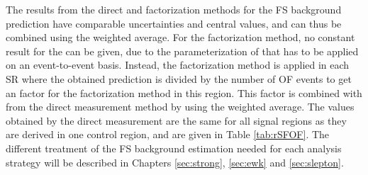 The results from the direct and factorization methods for the FS background prediction have comparable uncertainties and central values, and can thus be combined using the weighted average. 
For the factorization method, no constant result for the \Rsfof can be given, due to the parameterization of \rmue that has to be applied on an event-to-event basis.
Instead, the factorization method is applied in each SR where the obtained prediction is divided by the number of OF events to get an \Rsfof factor for the factorization method in this region. 
This factor is combined with \Rsfof from the direct measurement method by using the weighted average.
The \Rsfof values obtained by the direct measurement are the same for all signal regions as they are derived in one control region, and are given in Table \ref{tab:rSFOF}. 
The different treatment of the FS background estimation needed for each analysis strategy will be described in Chapters \ref{sec:strong}, \ref{sec:ewk} and \ref{sec:slepton}.          
